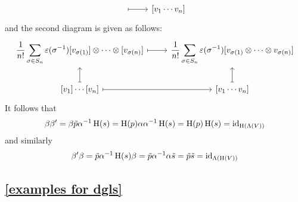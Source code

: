\begin{enumerate}
\[\begin{tikzcd}
        \arrow[mapsto]{r}
        &
        {[v_1 \dotsm v_n]}
      \end{tikzcd}
    \]
    and the second diagram is given as follows:
    \[
      \begin{tikzcd}
        \displaystyle
        \frac{1}{n!} \sum_{\sigma \in S_n} \varepsilon(\sigma^{-1})
        {[v_{\sigma(1)}]} \tensor \dotsb \tensor {[v_{\sigma(n)}]}
        \arrow[mapsto]{r}
        &
        \displaystyle
        \frac{1}{n!} \sum_{\sigma \in S_n} \varepsilon(\sigma^{-1})
        {[v_{\sigma(1)} \tensor \dotsb \tensor v_{\sigma(n)}]}
        \\
        {[v_1]} \dotsm {[v_n]}
        \arrow[mapsto]{u}
        \arrow[mapsto]{r}
        &
        {[v_1 \dotsm v_n]}
        \arrow[mapsto]{u}
      \end{tikzcd}
    \]
    It follows that
    \[
      \beta \beta'
      =
      \beta \tilde{p} \alpha^{-1} \operatorname{H}(s)
      =
      \operatorname{H}(p) \alpha \alpha^{-1} \operatorname{H}(s)
      =
      \operatorname{H}(p) \operatorname{H}(s)
      =
      \operatorname{id}_{\operatorname{H}(\operatorname{\Lambda}(V))}
    \]
    and similarly
    \[
      \beta' \beta
      =
      \tilde{p} \alpha^{-1} \operatorname{H}(s) \beta
      =
      \tilde{p} \alpha^{-1} \alpha \tilde{s}
      =
      \tilde{p} \tilde{s}
      =
      \operatorname{id}_{\operatorname{\Lambda}(\operatorname{H}(V))}
    \]
\end{enumerate}








\subsection{\cref{examples for dgls}}
\label{examples for dgls proof}

